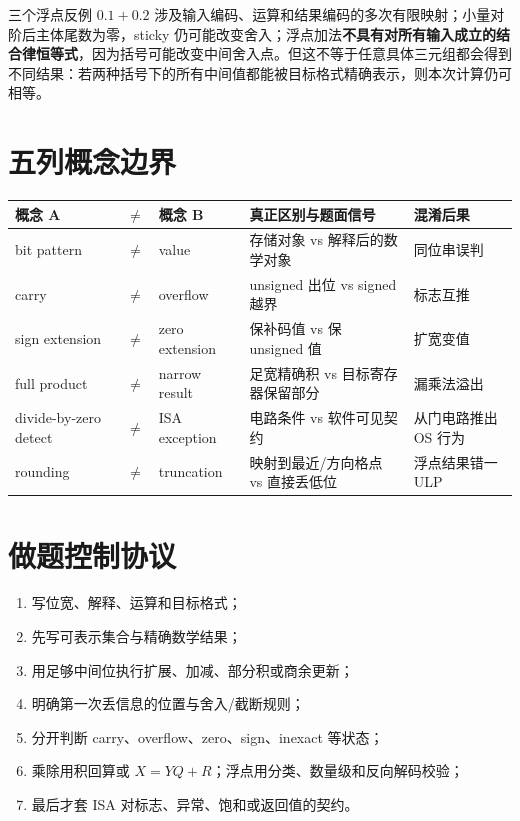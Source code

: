 \documentclass[UTF8,fontset=fandol,11pt,a4paper]{ctexart}
\begin{document}
\begin{warnbox}{三个浮点反例}
$0.1+0.2$ 涉及输入编码、运算和结果编码的多次有限映射；小量对阶后主体尾数为零，sticky 仍可能改变舍入；浮点加法\textbf{不具有对所有输入成立的结合律恒等式}，因为括号可能改变中间舍入点。但这不等于任意具体三元组都会得到不同结果：若两种括号下的所有中间值都能被目标格式精确表示，则本次计算仍可相等。
\end{warnbox}

\section{五列概念边界}
\begin{center}\small
\begin{tabularx}{\linewidth}{L{1.8cm}C{0.35cm}L{1.9cm}YY}\toprule
概念 A & $\neq$ & 概念 B & 真正区别与题面信号 & 混淆后果\\\midrule
bit pattern & $\neq$ & value & 存储对象 vs 解释后的数学对象 & 同位串误判\\
carry & $\neq$ & overflow & unsigned 出位 vs signed 越界 & 标志互推\\
sign extension & $\neq$ & zero extension & 保补码值 vs 保 unsigned 值 & 扩宽变值\\
full product & $\neq$ & narrow result & 足宽精确积 vs 目标寄存器保留部分 & 漏乘法溢出\\
divide-by-zero detect & $\neq$ & ISA exception & 电路条件 vs 软件可见契约 & 从门电路推出 OS 行为\\
rounding & $\neq$ & truncation & 映射到最近/方向格点 vs 直接丢低位 & 浮点结果错一 ULP\\
\bottomrule
\end{tabularx}
\end{center}

\section{做题控制协议}
\begin{enumerate}
\item 写位宽、解释、运算和目标格式；
\item 先写可表示集合与精确数学结果；
\item 用足够中间位执行扩展、加减、部分积或商余更新；
\item 明确第一次丢信息的位置与舍入/截断规则；
\item 分开判断 carry、overflow、zero、sign、inexact 等状态；
\item 乘除用积回算或 $X=YQ+R$；浮点用分类、数量级和反向解码校验；
\item 最后才套 ISA 对标志、异常、饱和或返回值的契约。
\end{enumerate}
\end{document}
